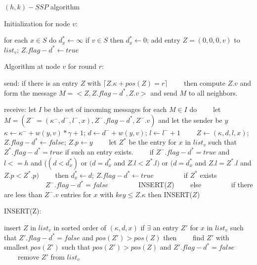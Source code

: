 \documentclass[11pt]{article}  %
\begin{document}
\begin{algorithm}[!h]
    \caption{$(h,k)-SSP$ algorithm}%
    \hspace*{0.02in} Initialization for node $v$:
    \begin{algorithmic}[1]
        \STATE for each $x \in S$ do $d^{*}_{x} \gets \infty$
        \STATE if $v \in S$ then $d^{*}_{x} \gets 0$; add entry $Z=(0,0,0,v)$ to $list_v$; $Z.flag-d^* \gets true$
    \end{algorithmic}

    \hspace*{0.02in} Algorithm at node $v$ for round $r$:
    \begin{algorithmic}[1]
        \STATE send: if there is an entry $Z$ with $\lceil Z.\kappa + pos(Z) = r \rceil $
        \STATE ~~~~then compute $Z.v$ and form the message $M = <Z, Z.flag-d^*, Z.v>$ and send $M$ to all neighbors.

        \STATE receive: let $I$ be the set of incoming messages
        \STATE for each $M \in I$ do
        \STATE ~~~~let $M = (Z^- = (\kappa ^-, d^-, l^-,x), Z^-.flag-d^*, Z^-.v) $ and let the sender be $y$
        \STATE ~~~~$\kappa \gets \kappa ^- + w(y,v)*\gamma + 1$; $d \gets d^- +w(y,v)$; $l \gets l^- +1$
        \STATE ~~~~$Z \gets (\kappa, d, l, x)$; $Z.flag-d^* \gets false$; $Z.p \gets y$
        \STATE ~~~~let $Z^*$ be the entry for $x$ in $list_v$ such that $Z^*.flag-d^* = true$ if such an entry exists.
        \STATE ~~~~if $Z^-.flag-d^*=true$ and $l<=h$ and ($(d<d^{*}_{x})$ or $(d=d^{*}_{x}$ and $Z.l< Z^*.l)$ or $(d=d^{*}_{x}$ and $Z.l = Z^*.l$ and $Z.p < Z^*.p)$
        \STATE ~~~~then $d^{*}_{x} \gets d$; $Z.flag-d^* \gets true$
        \STATE ~~~~~~~~if $Z^*$ exists
        \STATE ~~~~~~~~~~~~$Z^-.flag-d^*=false$
        \STATE ~~~~~~~~INSERT($Z$)
        \STATE ~~~~else
        \STATE ~~~~~~~~if there are less than $Z^-.v$ entries for $x$ with $key \leq Z.\kappa$ then INSERT($Z$)
    \end{algorithmic}

    \hspace*{0.02in} INSERT(Z):
    \begin{algorithmic}[1]
        \STATE insert $Z$ in $list_v$ in sorted order of $(\kappa,d,x)$
        \STATE if $\exists$ an entry $Z'$ for $x$ in $list_v$ such that $Z'.flag-d^* = false$ and $pos(Z')>pos(Z)$ then
        \STATE ~~~~find $Z'$ with smallest $pos(Z')$ such that $pos(Z')>pos(Z)$ and $Z'.flag-d^* = false$
        \STATE ~~~~remove $Z'$ from $list_v$
    \end{algorithmic}

\end{algorithm}
\end{document}
